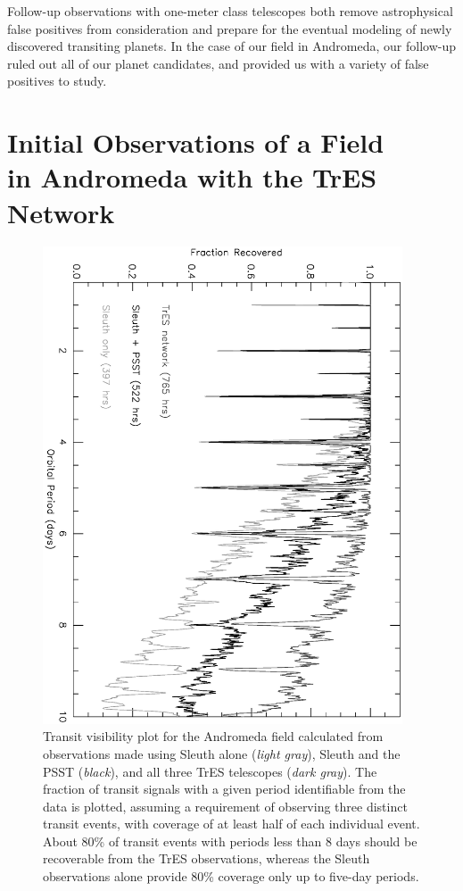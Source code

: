 Follow-up observations with one-meter class telescopes both remove astrophysical false positives from consideration and prepare for the eventual modeling of newly discovered transiting planets. In the case of our field in Andromeda, our follow-up ruled out all of our planet candidates, and provided us with a variety of false positives to study.

\section[Initial Observations of a Field in Andromeda]{Initial Observations of a Field \\ in Andromeda with the TrES Network}\label{cha:and0:sec:obs}

\begin{figure}
\begin{center}
\includegraphics[angle=90, width=0.95\textwidth]{2_f1}
\caption[Fraction of potential transit signals identifiable from And0 data]{Transit visibility plot for the Andromeda field calculated from observations made using Sleuth alone (\textit{light gray}), Sleuth and the PSST (\textit{black}), and all three TrES telescopes (\textit{dark gray}). The fraction of transit signals with a given period identifiable from the data is plotted, assuming a requirement of observing three distinct transit events, with coverage of at least half of each individual event. About 80\% of transit events with periods less than 8 days should be recoverable from the TrES observations, whereas the Sleuth observations alone provide 80\% coverage only up to five-day periods.}\label{cha:and0:fig:vis}
\end{center}
\end{figure}

